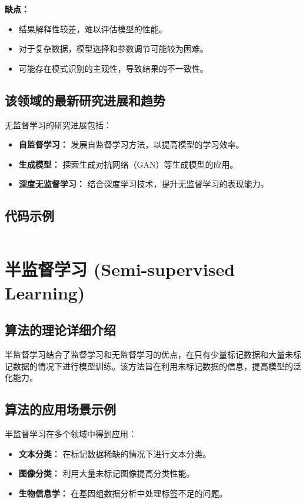 \textbf{缺点：}
\begin{itemize}
    \item 结果解释性较差，难以评估模型的性能。
    \item 对于复杂数据，模型选择和参数调节可能较为困难。
    \item 可能存在模式识别的主观性，导致结果的不一致性。
\end{itemize}

\subsection*{该领域的最新研究进展和趋势}
无监督学习的研究进展包括：
\begin{itemize}
    \item \textbf{自监督学习：} 发展自监督学习方法，以提高模型的学习效率。
    \item \textbf{生成模型：} 探索生成对抗网络（GAN）等生成模型的应用。
    \item \textbf{深度无监督学习：} 结合深度学习技术，提升无监督学习的表现能力。
\end{itemize}
\subsection*{代码示例}
\begin{lstlisting}

\end{lstlisting}


\section{半监督学习 (Semi-supervised Learning)}
\subsection*{算法的理论详细介绍}
半监督学习结合了监督学习和无监督学习的优点，在只有少量标记数据和大量未标记数据的情况下进行模型训练。该方法旨在利用未标记数据的信息，提高模型的泛化能力。

\subsection*{算法的应用场景示例}
半监督学习在多个领域中得到应用：
\begin{itemize}
    \item \textbf{文本分类：} 在标记数据稀缺的情况下进行文本分类。
    \item \textbf{图像分类：} 利用大量未标记图像提高分类性能。
    \item \textbf{生物信息学：} 在基因组数据分析中处理标签不足的问题。
\end{itemize}

